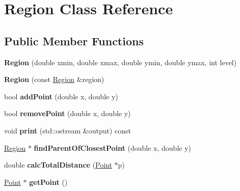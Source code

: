 \hypertarget{class_region}{
\section{Region Class Reference}
\label{class_region}
}
\subsection*{Public Member Functions}
\begin{DoxyCompactItemize}
\item 
\hypertarget{class_region_a8139c5d4e457c2894c6e2347aafbc3f0}{
{\bfseries Region} (double xmin, double xmax, double ymin, double ymax, int level)}
\label{class_region_a8139c5d4e457c2894c6e2347aafbc3f0}

\item 
\hypertarget{class_region_a685d0d0d58fdaeb358ddd600756c583c}{
{\bfseries Region} (const \hyperlink{class_region}{Region} \&region)}
\label{class_region_a685d0d0d58fdaeb358ddd600756c583c}

\item 
\hypertarget{class_region_ab0acbdd642f16b97be64f57789ba9e00}{
bool {\bfseries addPoint} (double x, double y)}
\label{class_region_ab0acbdd642f16b97be64f57789ba9e00}

\item 
\hypertarget{class_region_a3af1484669994a718b06d9871f80a682}{
bool {\bfseries removePoint} (double x, double y)}
\label{class_region_a3af1484669994a718b06d9871f80a682}

\item 
\hypertarget{class_region_ab90846ad2c5596e1ca921ff067aba8c1}{
void {\bfseries print} (std::ostream \&output) const }
\label{class_region_ab90846ad2c5596e1ca921ff067aba8c1}

\item 
\hypertarget{class_region_ac997f2c9ff803436e7b3bcb3cc25d4ed}{
\hyperlink{class_region}{Region} $\ast$ {\bfseries findParentOfClosestPoint} (double x, double y)}
\label{class_region_ac997f2c9ff803436e7b3bcb3cc25d4ed}

\item 
\hypertarget{class_region_a2bdc84a8ea633f136672ef54901c008b}{
double {\bfseries calcTotalDistance} (\hyperlink{class_point}{Point} $\ast$p)}
\label{class_region_a2bdc84a8ea633f136672ef54901c008b}

\item 
\hypertarget{class_region_a3bdf607ab9f8a89e1ab39acb123abf53}{
\hyperlink{class_point}{Point} $\ast$ {\bfseries getPoint} ()}
\label{class_region_a3bdf607ab9f8a89e1ab39acb123abf53}


\end{DoxyCompactItemize}
